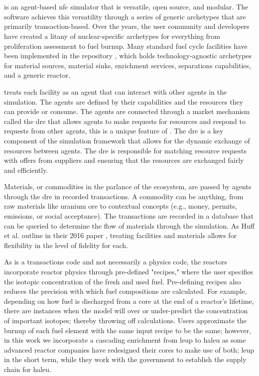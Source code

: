 \section{\cyclus}
\label{sec:cyclus}
\cyclus is an agent-based \gls{nfc} simulator that is versatile, open source,
and modular. The software achieves this versatility through a series of generic
archetypes that are primarily transaction-based. Over the years, the user
community and developers have created a litany of nuclear-specific archetypes
for everything from proliferation assessment to fuel burnup. Many standard fuel
cycle facilities have been implemented in the \cycamore repository
\cite{Carlsen_cycamore_2014}, which holds technology-agnostic archetypes for
material sources, material sinks, enrichment services, separations
capabilities, and a generic reactor.

\cyclus treats each facility as an agent that can interact with other agents in
the simulation. The agents are defined by their capabilities and the resources
they can provide or consume. The agents are connected through a market
mechanism called the \gls{dre} that allows agents to make requests for
resources and respond to requests from other agents, this is a unique feature
of \cyclus. The \gls{dre} is a key component of the \cyclus simulation
framework that allows for the dynamic exchange of resources between agents. The
\gls{dre} is responsible for matching resource requests with offers from
suppliers and ensuring that the resources are exchanged fairly and efficiently.

Materials, or commodities in the parlance of the \cyclus ecosystem, are passed
by agents through the \gls{dre} in recorded transactions. A commodity can be
anything, from raw materials like uranium ore to contextual concepts (e.g.,
money, permits, emissions, or social acceptance). The transactions are recorded
in a database that can be queried to determine the flow of materials through
the simulation. As Huff et al. outline in their 2016 paper
\cite{huff_cyclus_intro_2016}, treating facilities and materials allows for
flexibility in the level of fidelity for each.

As \cyclus is a transactions code and not necessarily a physics code,
the reactors incorporate reactor physics through pre-defined "recipes,"
where the user specifies the isotopic concentration of the fresh and
used fuel. Pre-defining recipes also reduces the precision with which
fuel compositions are calculated. For example, depending on how fuel is
discharged from a core at the end of a reactor's lifetime, there are
instances when the model will over or under-predict the concentration of
important isotopes; thereby throwing off calculations. Users approximate
the burnup of each fuel element with the same input recipe to be the
same; however, in this work we incorporate a cascading enrichment from
\gls{leup} to \gls{haleu} as some advanced reactor companies have
redesigned their cores to make use of both; \gls{leup} in the short term,
while they work with the government to establish the supply chain for
\gls{haleu}.

